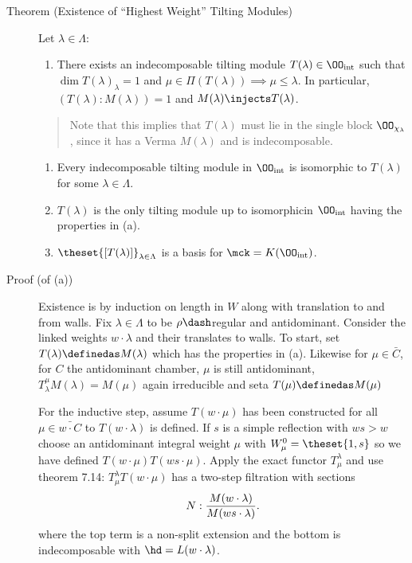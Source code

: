 \begin{description}
\item[Theorem (Existence of ``Highest Weight'' Tilting Modules)]
Let \(\lambda \in \Lambda\):

\begin{enumerate}
\def\labelenumi{\alph{enumi}.}
\tightlist
\item
  There exists an indecomposable tilting module
  \(T(\lambda) \in \OO_{\text{int}}\) such that
  \(\dim T(\lambda)_\lambda = 1\) and
  \(\mu \in \Pi(T(\lambda)) \implies \mu \leq \lambda\). In particular,
  \(( T(\lambda): M(\lambda) ) = 1\) and
  \(M(\lambda) \injects T(\lambda)\).
\end{enumerate}

\begin{quote}
Note that this implies that \(T(\lambda)\) must lie in the single block
\(\OO_{\chi_\lambda}\), since it has a Verma \(M(\lambda)\) and is
indecomposable.
\end{quote}

\begin{enumerate}
\def\labelenumi{\alph{enumi}.}
\setcounter{enumi}{1}
\tightlist
\item
  Every indecomposable tilting module in \(\OO_{\text{int}}\) is
  isomorphic to \(T(\lambda)\) for some \(\lambda \in \Lambda\).
\item
  \(T(\lambda)\) is the only tilting module up to isomorphicin
  \(\OO_{\text{int}}\) having the properties in (a).
\item
  \(\theset{[T(\lambda)]}_{\lambda \in \Lambda}\) is a basis for
  \(\mck = K(\OO_{\text{int}})\).
\end{enumerate}
\item[Proof (of (a))]
Existence is by induction on length in \(W\) along with translation to
and from walls. Fix \(\lambda \in \Lambda\) to be \(\rho\dash\)regular
and antidominant. Consider the linked weights \(w\cdot \lambda\) and
their translates to walls. To start, set
\(T(\lambda) \definedas M(\lambda)\) which has the properties in (a).
Likewise for \(\mu \in \bar C\), for \(C\) the antidominant chamber,
\(\mu\) is still antidominant, \(T_\lambda^\mu M(\lambda) = M(\mu)\)
again irreducible and seta \(T(\mu) \definedas M(\mu)\)

For the inductive step, assume \(T(w\cdot \mu)\) has been constructed
for all \(\mu \in \bar{w\cdot C}\) to \(T(w\cdot \lambda)\) is defined.
If \(s\) is a simple reflection with \(ws > w\) choose an antidominant
integral weight \(\mu\) with \(W_{\mu}^0 = \theset{1, s}\) so we have
defined \(T(w\cdot \mu) T(ws \cdot \mu)\). Apply the exact functor
\(T_\mu^\lambda\) and use theorem 7.14: \(T_\mu^\lambda T(w\cdot \mu)\)
has a two-step filtration with sections \begin{align*}
N: {M(w\cdot \lambda) \over M(ws\cdot \lambda)  }
.\end{align*} where the top term is a non-split extension and the bottom
is indecomposable with \(\hd = L(w\cdot \lambda)\).


\end{description}

